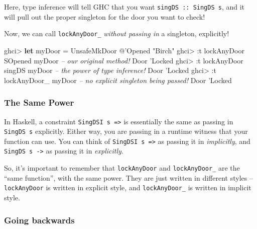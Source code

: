 \documentclass[]{article}
\newenvironment{Shaded}{\begin{snugshade}}{\end{snugshade}}
\newcommand{\CharTok}[1]{\textcolor[rgb]{0.31,0.60,0.02}{#1}}
\newcommand{\CommentTok}[1]{\textcolor[rgb]{0.56,0.35,0.01}{\textit{#1}}}
\newcommand{\DataTypeTok}[1]{\textcolor[rgb]{0.13,0.29,0.53}{#1}}
\newcommand{\FunctionTok}[1]{\textcolor[rgb]{0.00,0.00,0.00}{#1}}
\newcommand{\KeywordTok}[1]{\textcolor[rgb]{0.13,0.29,0.53}{\textbf{#1}}}
\newcommand{\NormalTok}[1]{#1}
\begin{document}
Here, type inference will tell GHC that you want \texttt{singDS\ ::\ SingDS\ s},
and it will pull out the proper singleton for the door you want to check!

Now, we can call \texttt{lockAnyDoor\_} \emph{without passing in} a singleton,
explicitly!

\begin{Shaded}
\begin{Highlighting}[]
\NormalTok{ghci}\FunctionTok{>} \KeywordTok{let}\NormalTok{ myDoor }\FunctionTok{=} \DataTypeTok{UnsafeMkDoor} \FunctionTok{@}\CharTok{'Opened "Birch"}
\NormalTok{ghci}\FunctionTok{>} \FunctionTok{:}\NormalTok{t lockAnyDoor }\DataTypeTok{SOpened}\NormalTok{ myDoor }\CommentTok{-- our original method!}
\DataTypeTok{Door} \CharTok{'Locked}
\NormalTok{ghci}\FunctionTok{>} \FunctionTok{:}\NormalTok{t lockAnyDoor singDS myDoor  }\CommentTok{-- the power of type inference!}
\DataTypeTok{Door} \CharTok{'Locked}
\NormalTok{ghci}\FunctionTok{>} \FunctionTok{:}\NormalTok{t lockAnyDoor_ myDoor        }\CommentTok{-- no explicit singleton being passed!}
\DataTypeTok{Door} \CharTok{'Locked}
\end{Highlighting}
\end{Shaded}

\hypertarget{the-same-power}{%
\subsubsection{The Same Power}\label{the-same-power}}

In Haskell, a constraint \texttt{SingDSI\ s\ =\textgreater{}} is essentially the
same as passing in \texttt{SingDS\ s} explicitly. Either way, you are passing in
a runtime witness that your function can use. You can think of
\texttt{SingDSI\ s\ =\textgreater{}} as passing it in \emph{implicitly}, and
\texttt{SingDS\ s\ -\textgreater{}} as passing it in \emph{explicitly}.

So, it's important to remember that \texttt{lockAnyDoor} and
\texttt{lockAnyDoor\_} are the ``same function'', with the same power. They are
just written in different styles -- \texttt{lockAnyDoor} is written in explicit
style, and \texttt{lockAnyDoor\_} is written in implicit style.

\hypertarget{going-backwards}{%
\subsubsection{Going backwards}\label{going-backwards}}
\end{document}
